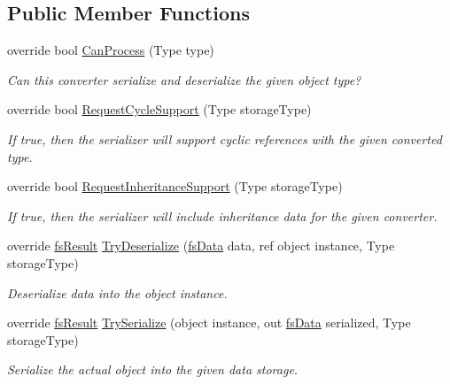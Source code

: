\subsection*{Public Member Functions}
\begin{DoxyCompactItemize}
\item 
override bool \hyperlink{class_full_serializer_1_1_internal_1_1fs_key_value_pair_converter_acedb142bdabfb30c6cd43874734cbc33}{Can\+Process} (Type type)
\begin{DoxyCompactList}\small\item\em Can this converter serialize and deserialize the given object type? \end{DoxyCompactList}\item 
override bool \hyperlink{class_full_serializer_1_1_internal_1_1fs_key_value_pair_converter_a0a18762f776b7e00ab59d7827d3e50cc}{Request\+Cycle\+Support} (Type storage\+Type)
\begin{DoxyCompactList}\small\item\em If true, then the serializer will support cyclic references with the given converted type. \end{DoxyCompactList}\item 
override bool \hyperlink{class_full_serializer_1_1_internal_1_1fs_key_value_pair_converter_af20b5573e313464e13c17735746a2267}{Request\+Inheritance\+Support} (Type storage\+Type)
\begin{DoxyCompactList}\small\item\em If true, then the serializer will include inheritance data for the given converter. \end{DoxyCompactList}\item 
override \hyperlink{struct_full_serializer_1_1fs_result}{fs\+Result} \hyperlink{class_full_serializer_1_1_internal_1_1fs_key_value_pair_converter_ab4698a9f8ed356f17a68c3936808d5d3}{Try\+Deserialize} (\hyperlink{class_full_serializer_1_1fs_data}{fs\+Data} data, ref object instance, Type storage\+Type)
\begin{DoxyCompactList}\small\item\em Deserialize data into the object instance. \end{DoxyCompactList}\item 
override \hyperlink{struct_full_serializer_1_1fs_result}{fs\+Result} \hyperlink{class_full_serializer_1_1_internal_1_1fs_key_value_pair_converter_a14c04b4be8e3bb4533966a4b3eabb554}{Try\+Serialize} (object instance, out \hyperlink{class_full_serializer_1_1fs_data}{fs\+Data} serialized, Type storage\+Type)
\begin{DoxyCompactList}\small\item\em Serialize the actual object into the given data storage. \end{DoxyCompactList}\end{DoxyCompactItemize}
